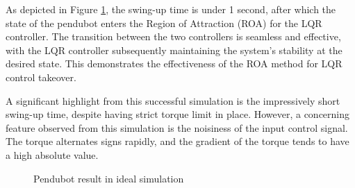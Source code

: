 As depicted in Figure \ref{fig:ideal_simulation_pendubot}, the swing-up time is under 1 second, after which the state of the pendubot enters the Region of Attraction (ROA) for the LQR controller. The transition between the two controllers is seamless and effective, with the LQR controller subsequently maintaining the system's stability at the desired state. This demonstrates the effectiveness of the ROA method for LQR control takeover.

A significant highlight from this successful simulation is the impressively short swing-up time, despite having strict torque limit in place. However, a concerning feature observed from this simulation is the noisiness of the input control signal. The torque alternates signs rapidly, and the gradient of the torque tends to have a high absolute value.

\begin{figure}[H]
    \centering
    \caption{Pendubot result in ideal simulation }
    \label{fig:ideal_simulation_pendubot}
\end{figure}

